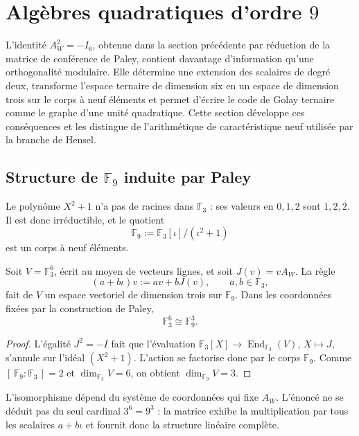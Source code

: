 \chapter{Algèbres quadratiques d'ordre \(9\)}
\label{chap:algebras-cuadraticas-orden-nueve}

L'identité \(A_W^2=-I_6\), obtenue dans la section précédente par réduction
de la matrice de conférence de Paley, contient davantage d'information qu'une
orthogonalité modulaire. Elle détermine une extension des scalaires de degré deux,
transforme l'espace ternaire de dimension six en un espace de dimension
trois sur le corps à neuf éléments et permet d'écrire le code de
Golay ternaire comme le graphe d'une unité quadratique. Cette section développe
ces conséquences et les distingue de l'arithmétique de caractéristique neuf
utilisée par la branche de Hensel.

\section{Structure de \texorpdfstring{\(\mathbb F_9\)}{F9} induite par Paley}

Le polynôme \(X^2+1\) n'a pas de racines dans \(\mathbb F_3\) : ses valeurs en
\(0,1,2\) sont \(1,2,2\). Il est donc irréductible, et le quotient
\[
 \mathbb F_9
 :=\mathbb F_3[\iota]/(\iota^2+1)
\]
est un corps à neuf éléments.

\begin{theorem}
\label{thm:f9-tres-desde-paley}
Soit \(V=\mathbb F_3^6\), écrit au moyen de vecteurs lignes, et soit
\(J(v)=vA_W\). La règle
\[
 (a+b\iota)v:=av+bJ(v),
 \qquad a,b\in\mathbb F_3,
\]
fait de \(V\) un espace vectoriel de dimension trois sur
\(\mathbb F_9\). Dans les coordonnées fixées par la construction de Paley,
\[
 \mathbb F_3^6\cong\mathbb F_9^3.
\]
\end{theorem}

\begin{proof}
L'égalité \(J^2=-I\) fait que l'évaluation
\(\mathbb F_3[X]\to\operatorname{End}_{\mathbb F_3}(V)\), \(X\mapsto J\),
s'annule sur l'idéal \((X^2+1)\). L'action se factorise donc par
le corps \(\mathbb F_9\). Comme
\([\,\mathbb F_9:\mathbb F_3\,]=2\) et
\(\dim_{\mathbb F_3}V=6\), on obtient
\(\dim_{\mathbb F_9}V=3\).
\end{proof}

L'isomorphisme dépend du système de coordonnées qui fixe \(A_W\). L'énoncé
ne se déduit pas du seul cardinal \(3^6=9^3\) : la matrice exhibe la
multiplication par tous les scalaires \(a+b\iota\) et fournit donc
la structure linéaire complète.


